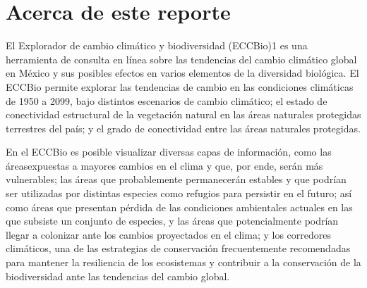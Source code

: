 \documentclass{article}
\begin{document}
	
	
	\section*{Acerca de este reporte}

	El Explorador de cambio clim\'atico y biodiversidad (ECCBio)1 es una herramienta de consulta en l\'inea sobre las tendencias del cambio clim\'atico global en M\'exico y sus posibles efectos en varios elementos de la diversidad biol\'ogica. El ECCBio permite explorar las tendencias de cambio en las condiciones clim\'aticas de 1950 a 2099, bajo distintos escenarios de cambio clim\'atico; el estado de conectividad estructural de la vegetaci\'on natural en las \'areas naturales protegidas terrestres del pa\'is; y el grado de conectividad entre las \'areas naturales protegidas. 

	En el ECCBio es posible visualizar diversas capas de informaci\'on, como las \'areasexpuestas a mayores cambios en el clima y que, por ende, ser\'an m\'as vulnerables; las \'areas que probablemente permanecer\'an estables y que podr\'ian ser utilizadas por distintas especies como refugios para persistir en el futuro; as\'i como \'areas que presentan p\'erdida de las condiciones ambientales actuales en las que subsiste un conjunto de especies, y las \'areas que potencialmente podr\'ian llegar a colonizar ante los cambios proyectados en el clima; y los corredores clim\'aticos, una de las estrategias de conservaci\'on frecuentemente recomendadas para mantener la resiliencia de los ecosistemas y contribuir a la conservaci\'on de la biodiversidad ante las tendencias del cambio global.
\end{document}
